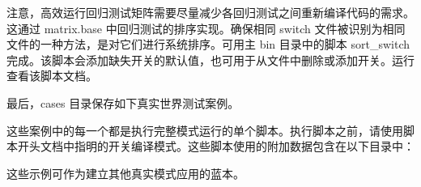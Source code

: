\noindent
注意，高效运行回归测试矩阵需要尽量减少各回归测试之间重新编译代码的需求。这通过 {\file matrix.base} 中回归测试的排序实现。确保相同 switch 文件被识别为相同文件的一种方法，是对它们进行系统排序。可用主 {\file bin} 目录中的脚本 {\file sort\_switch} 完成。该脚本会添加缺失开关的默认值，也可用于从文件中删除或添加开关。运行  查看该脚本文档。

\vspace{\baselineskip} \noindent
最后，{\file cases} 目录保存如下真实世界测试案例。

\begin{flist}
\end{flist}

\noindent
这些案例中的每一个都是执行完整模式运行的单个脚本。执行脚本之前，请使用脚本开头文档中指明的开关编译模式。这些脚本使用的附加数据包含在以下目录中：

\begin{flist}
\end{flist}

\noindent
这些示例可作为建立其他真实模式应用的蓝本。


